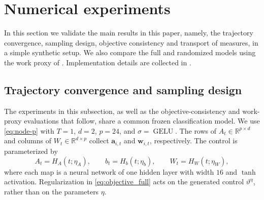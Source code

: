 \documentclass[twoside,11pt]{article}
\theoremstyle{plain}
\def\R{\mathbb R}
\begin{document}



\section{Numerical experiments}\label{sec:numerical_results}

In this section we validate the main results in this paper, namely, the trajectory convergence, sampling design, objective consistency and transport of measures, in a simple synthetic setup. We also compare the full and randomized models using the work proxy of . Implementation details are collected in .

\subsection{Trajectory convergence and sampling design}\label{subsec:num_trajectory}

The experiments in this subsection, as well as the objective-consistency and work-proxy evaluations that follow, share a common frozen classification model. We use \eqref{eq:node-p} with $T=1$, $d=2$, $p=24$, and $\sigma=\operatorname{GELU}$. The rows of $A_t\in\R^{p\times d}$ and columns of $W_t\in\R^{d\times p}$ collect $\mathbf a_{i,t}$ and $\mathbf w_{i,t}$, respectively. The control is parameterized by
\[
A_t=H_A(t;\eta_A),\qquad b_t=H_b(t;\eta_b),\qquad W_t=H_W(t;\eta_W),
\]
where each map is a neural network of one hidden layer with width $16$ and $\tanh$ activation. Regularization in \eqref{eq:objective_full} acts on the generated control $\vartheta^\eta$, rather than on the parameters $\eta$.
\end{document}
